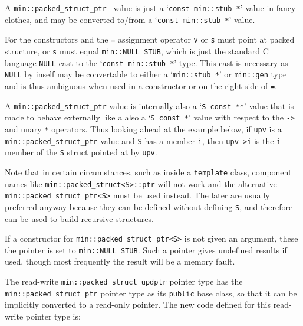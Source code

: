 \documentclass[12pt]{article}
\newcommand{\EOL}{\penalty \exhyphenpenalty}
\begin{document}
A {\tt min::\EOL packed\_\EOL struct\_\EOL ptr \SARG} value is just
a `{\tt const min::stub~*}' value in fancy clothes, and may be
converted to/from a `{\tt const min::stub~*}' value.

For the constructors and the {\tt =} assignment operator \verb|v| or
\verb|s| must point at packed structure, or \verb|s| must equal
\verb|min::NULL_STUB|, which is just the standard C language \verb|NULL|
cast to the `\verb|const min::stub *|' type.  This cast is necessary
as \verb|NULL| by inself may be convertable to either a `\verb|min::stub *|'
or \verb|min::gen| type and is thus ambiguous when used in a constructor
or on the right side of \verb|=|.

A {\tt min::\EOL packed\_\EOL struct\_\EOL ptr\SARG} value is internally
also a `\verb|S const **|' value that is made to behave externally like a
also a `\verb|S const *|' value with respect to the \verb|->| and
unary \verb|*| operators.  Thus looking ahead at the example below,
if \verb|upv| is a
{\tt min::\EOL packed\_\EOL struct\_\EOL ptr\SARG} value
and \verb|S| has a member \verb|i|, then \verb|upv->i| is the \verb|i|
member of the \verb|S| struct pointed at by \verb|upv|.

Note that in certain
circumstances, such as inside a {\tt template} class,
component names like {\tt min::\EOL packed\_\EOL struct<S>::ptr} will not work
and the alternative {\tt min::\EOL packed\_\EOL struct\_\EOL ptr<S>}
must be used instead.  The later are usually preferred anyway because
they can be defined without defining \verb|S|, and therefore can be
used to build recursive structures.

If a constructor for {\tt min::\EOL packed\_\EOL struct\_\EOL ptr<S>}
is not given an argument, these the pointer is set to
\verb|min::NULL_STUB|.  Such a pointer gives undefined results if
used, though most frequently the result will be a memory fault.

The read-write {\tt min::\EOL packed\_\EOL struct\_\EOL updptr\SARG}
pointer type has the
{\tt min::\EOL packed\_\EOL struct\_\EOL ptr\SARG} pointer type as its
{\tt public} base class, so that it can be implicitly converted to
a read-only pointer.  The new code defined for this read-write
pointer type is:
\end{document}
